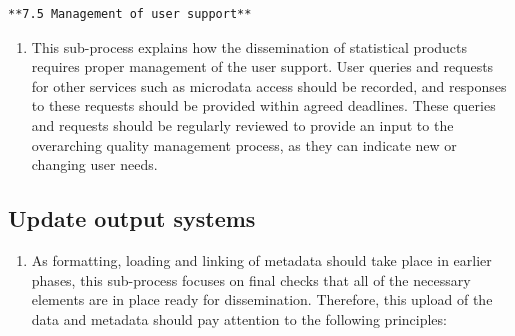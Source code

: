 \documentclass[
]{article}
\providecommand{\tightlist}{%
  \setlength{\itemsep}{0pt}\setlength{\parskip}{0pt}}
\begin{document}
\begin{verbatim}
**7.5 Management of user support**
\end{verbatim}

\begin{enumerate}
\def\labelenumi{\arabic{enumi}.}
\setcounter{enumi}{493}
\tightlist
\item
  This sub-process explains how the dissemination of statistical
  products requires proper management of the user support. User
  queries and requests for other services such as microdata access
  should be recorded, and responses to these requests should be
  provided within agreed deadlines. These queries and requests should
  be regularly reviewed to provide an input to the overarching quality
  management process, as they can indicate new or changing user needs.
\end{enumerate}

\hypertarget{update-output-systems-1}{%
\subsection{Update output systems}\label{update-output-systems-1}}

\begin{enumerate}
\def\labelenumi{\arabic{enumi}.}
\setcounter{enumi}{494}
\tightlist
\item
  As formatting, loading and linking of metadata should take place in
  earlier phases, this sub-process focuses on final checks that all of
  the necessary elements are in place ready for dissemination.
  Therefore, this upload of the data and metadata should pay attention
  to the following principles:
\end{enumerate}
\end{document}
